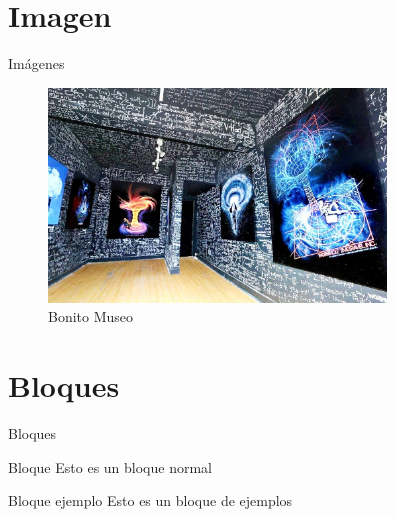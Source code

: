 \documentclass[a4paper,10pt]{beamer}
\begin{document}
\section{Imagen}
\begin{frame}{Im\'agenes}
\begin{figure}[h]
 \centering 
 \includegraphics[width=0.8\textwidth]{1}
 \captionsetup[figura]{name=Figura}
 \caption{Bonito Museo}
\end{figure}
\end{frame}

\section{Bloques}
\begin{frame}{Bloques}
 
 \begin{block}{Bloque}
  Esto es un bloque normal
 \end{block}
 
 \vfill
 
 \begin{exampleblock}{Bloque ejemplo}
  Esto es un bloque de ejemplos
 \end{exampleblock}
\end{frame}
\end{document}
